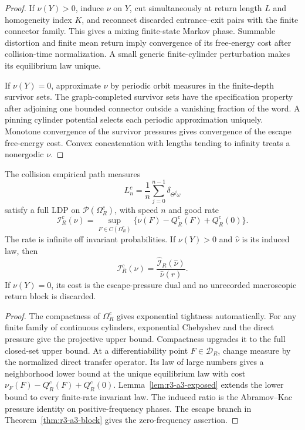\begin{proof}
If \(\nu(Y)>0\), induce \(\nu\) on \(Y\), cut simultaneously at return length
\(L\) and homogeneity index \(K\), and reconnect discarded entrance--exit
pairs with the finite connector family.  This gives a mixing finite-state
Markov phase.  Summable distortion and finite mean return imply convergence
of its free-energy cost after collision-time normalization.  A small generic
finite-cylinder perturbation makes its equilibrium law unique.

If \(\nu(Y)=0\), approximate \(\nu\) by periodic orbit measures in the
finite-depth survivor sets.  The graph-completed survivor sets have the
specification property after adjoining one bounded connector outside a
vanishing fraction of the word.  A pinning cylinder potential selects each
periodic approximation uniquely.  Monotone convergence of the survivor
pressures gives convergence of the escape free-energy cost.  Convex
concatenation with lengths tending to infinity treats a nonergodic \(\nu\).
\end{proof}

\begin{theorem}
\label{thm:r3-a3-collision-ldp}
The collision empirical path measures
\[
 L_n^c=\frac1n\sum_{j=0}^{n-1}
 \delta_{\Theta^j\omega}
\]
satisfy a full LDP on \(\mathcal P(\Omega_R^c)\), with speed \(n\) and good
rate
\[
 \boxed{
 \mathcal I_R^c(\nu)=
 \sup_{F\in C(\Omega_R^c)}
 \{\nu(F)-Q_R^c(F)+Q_R^c(0)\}.}
\]
The rate is infinite off invariant probabilities.  If \(\nu(Y)>0\) and
\(\widehat\nu\) is its induced law, then
\[
 \mathcal I_R^c(\nu)
 =\frac{\widehat{\mathcal I}_R(\widehat\nu)}
       {\widehat\nu(r)}.
\]
If \(\nu(Y)=0\), its cost is the escape-pressure dual and no unrecorded
macroscopic return block is discarded.
\end{theorem}

\begin{proof}
The compactness of \(\Omega_R^c\) gives exponential tightness automatically.
For any finite family of continuous cylinders, exponential Chebyshev and the
direct pressure give the projective upper bound.  Compactness upgrades it to
the full closed-set upper bound.  At a differentiability point
\(F\in\mathscr D_R\), change measure by the normalized direct transfer
operator.  Its law of large numbers gives a neighborhood lower bound at the
unique equilibrium law with cost
\(\nu_F(F)-Q_R^c(F)+Q_R^c(0)\).  Lemma~\ref{lem:r3-a3-exposed} extends the
lower bound to every finite-rate invariant law.  The induced ratio is the
Abramov--Kac pressure identity on positive-frequency phases.  The escape
branch in Theorem~\ref{thm:r3-a3-block} gives the zero-frequency assertion.
\end{proof}

